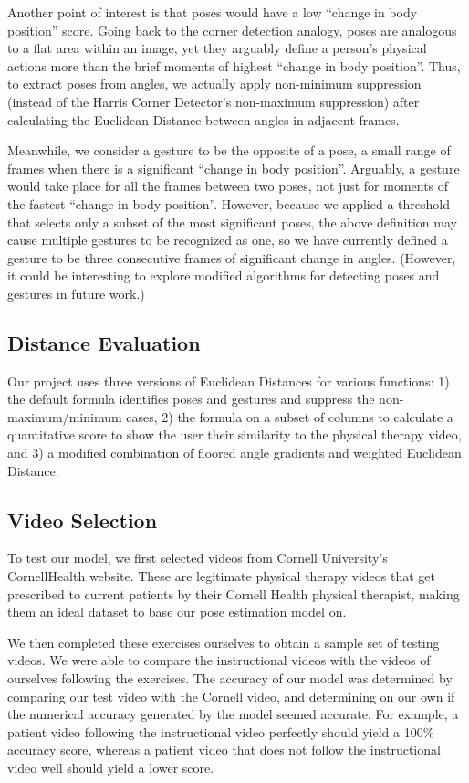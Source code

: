\indent Another point of interest is that poses would have a low “change in body position” score. Going back to the 
corner detection analogy, poses are analogous to a flat area within an  image, yet they arguably define a 
person’s physical actions more than the brief moments of highest “change in body position”. Thus, to extract 
poses from angles, we actually apply non-minimum suppression (instead of the Harris Corner Detector’s 
non-maximum suppression) after calculating the Euclidean Distance between angles in adjacent frames.

\indent Meanwhile, we consider a gesture to be the opposite of a pose, a small range of frames when there is a 
significant “change in body position”. Arguably, a gesture would take place for all the frames between 
two poses, not just for moments of the fastest “change in body position”. However, because we applied a 
threshold that selects only a subset of the most significant poses, the above definition may cause multiple 
gestures to be recognized as one, so we have currently defined a gesture to be three consecutive frames of 
significant change in angles. (However, it could be interesting to explore modified algorithms for detecting 
poses and gestures in future work.)

\subsection{Distance Evaluation}
\indent Our project uses three versions of Euclidean Distances for 
various functions: 1) the default formula identifies poses and gestures 
and suppress the non-maximum/minimum cases, 2) the formula on a subset 
of columns to calculate a quantitative score to show the user their 
similarity to the physical therapy video, and 3) a modified combination 
of floored angle gradients and weighted Euclidean Distance. 

\subsection{Video Selection}
\indent To test our model, we first selected videos from Cornell 
University’s CornellHealth website\cite{Alpher11}. These are legitimate 
physical therapy videos that get prescribed to current patients by their 
Cornell Health physical therapist, making them an ideal dataset to base 
our pose estimation model on.

\indent We then completed these exercises ourselves to obtain a sample 
set of testing videos. We were able to compare the instructional videos 
with the videos of ourselves following the exercises. The accuracy of 
our model was determined by comparing our test video with the Cornell 
video, and determining on our own if the numerical accuracy generated 
by the model seemed accurate. For example, a patient video following 
the instructional video perfectly should yield a 100\% accuracy score, 
whereas a patient video that does not follow the instructional video 
well should yield a lower score.
